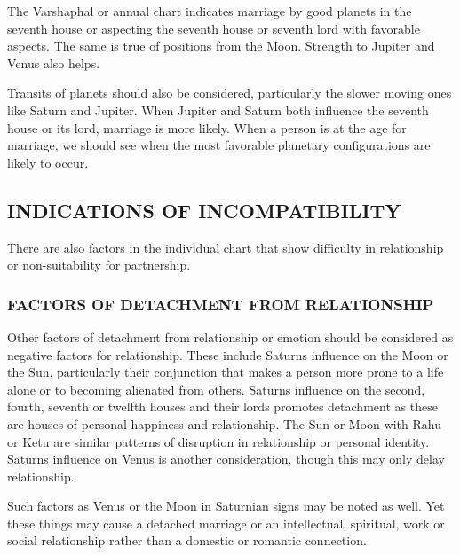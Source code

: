 
The Varshaphal or annual chart indicates marriage by good planets in the seventh house or aspecting the seventh house or seventh lord with favorable aspects. The same is true of positions from the Moon. Strength to Jupiter and Venus also helps.

 


Transits of planets should also be considered, particularly the slower moving ones like Saturn and Jupiter. When Jupiter and Saturn both influence the seventh house or its lord, marriage is more likely. When a person is at the age for marriage, we should see when the most favorable planetary configurations are likely to occur.

 

\subsection{INDICATIONS OF INCOMPATIBILITY}
 

There are also factors in the individual chart that show difficulty in relationship or non-suitability for partnership.

 

\subsubsection{FACTORS OF DETACHMENT FROM RELATIONSHIP }

 

Other factors of detachment from relationship or emotion should be considered as negative factors for relationship. These include Saturns influence on the Moon or the Sun, particularly their conjunction that makes a person more prone to a life alone or to becoming alienated from others. Saturns influence on the second, fourth, seventh or twelfth houses and their lords promotes detachment as these are houses of personal happiness and relationship. The Sun or Moon with Rahu or Ketu are similar patterns of disruption in relationship or personal identity. Saturns influence on Venus is another consideration, though this may only delay relationship.

 

Such factors as Venus or the Moon in Saturnian signs may be noted as well. Yet these things may cause a detached marriage or an intellectual, spiritual, work or social relationship rather than a domestic or romantic connection.

